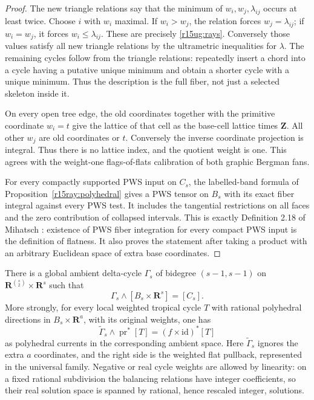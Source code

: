 \begin{proof}
The new triangle relations say that the minimum of
$w_i,w_j,\lambda_{ij}$ occurs at least twice. Choose $i$ with
$w_i$ maximal. If $w_i>w_j$, the relation forces
$w_j=\lambda_{ij}$; if $w_i=w_j$, it forces
$w_i\leq\lambda_{ij}$. These are precisely
\eqref{r15ug:rays}. Conversely those values satisfy all new
triangle relations by the ultrametric inequalities for $\lambda$.
The remaining cycles follow from the triangle relations: repeatedly
insert a chord into a cycle having a putative unique minimum and
obtain a shorter cycle with a unique minimum. Thus the description
is the full fiber, not just a selected skeleton inside it.

On every open tree edge, the old coordinates together with the
primitive coordinate $w_i=t$ give the lattice of that cell as the
base-cell lattice times $\mathbf Z$. All other $w_j$ are old
coordinates or $t$. Conversely the inverse coordinate projection
is integral. Thus there is no lattice index, and the quotient
weight is one. This agrees with the weight-one flags-of-flats
calibration of both graphic Bergman fans.

For every compactly supported PWS input on $C_s$, the labelled-band
formula of Proposition~\ref{r15ray:polyhedral} gives a PWS tensor
on $B_s$ with its exact fiber integral against every PWS test.
It includes the tangential restrictions on all faces and the zero
contribution of collapsed intervals. This is exactly Definition
2.18 of Mihatsch \cite{Mihatsch}: existence of PWS fiber integration
for every compact PWS input is the definition of flatness. It also
proves the statement after taking a product with an arbitrary
Euclidean space of extra base coordinates.
\end{proof}

\begin{lemma}
\label{r15ug:kernel}
There is a global ambient delta-cycle $\Gamma_s$ of bidegree
$(s-1,s-1)$ on
$\mathbf R^{\binom s2}\times\mathbf R^s$ such that
\[
 \Gamma_s\wedge[B_s\times\mathbf R^s]=[C_s].
\tag{UG15.3}\label{r15ug:cut}
\]
More strongly, for every local weighted tropical cycle $T$ with
rational polyhedral directions in
$B_s\times\mathbf R^a$, with its original weights, one has
\[
 \widetilde\Gamma_s\wedge\operatorname{pr}^*[T]
                   =(f\times\mathrm{id})^*[T]
\tag{UG15.4}\label{r15ug:all-cycles}
\]
as polyhedral currents in the corresponding ambient space.
Here $\widetilde\Gamma_s$ ignores the extra $a$ coordinates,
and the right side is the weighted flat pullback, represented
in the universal family. Negative or real cycle weights are
allowed by linearity: on a fixed rational subdivision the balancing
relations have integer coefficients, so their real solution space
is spanned by rational, hence rescaled integer, solutions.
\end{lemma}

